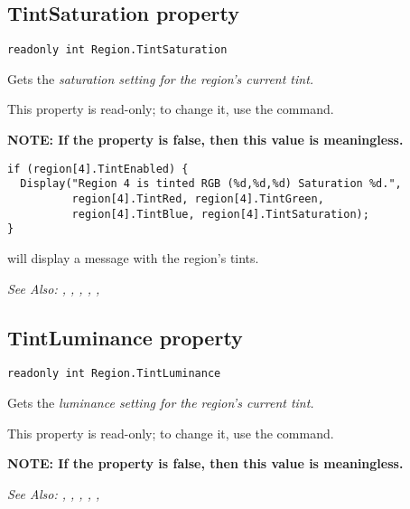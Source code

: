 \subsection{TintSaturation property}\label{Region.TintSaturation}%

\begin{verbatim}
readonly int Region.TintSaturation
\end{verbatim}
Gets the \it{saturation} setting for the region's current tint.

This property is read-only; to change it, use the  command.

\bf{NOTE:} If the  property is false, then
this value is meaningless.

\begin{verbatim}
if (region[4].TintEnabled) {
  Display("Region 4 is tinted RGB (%d,%d,%d) Saturation %d.",
          region[4].TintRed, region[4].TintGreen,
          region[4].TintBlue, region[4].TintSaturation);
}
\end{verbatim}
will display a message with the region's tints.

\it{See Also:} , ,
, ,
, 


\subsection{TintLuminance property}\label{Region.TintLuminance}%

\begin{verbatim}
readonly int Region.TintLuminance
\end{verbatim}
Gets the \it{luminance} setting for the region's current tint.

This property is read-only; to change it, use the  command.

\bf{NOTE:} If the  property is false, then
this value is meaningless.


\it{See Also:} , ,
, ,
, 



